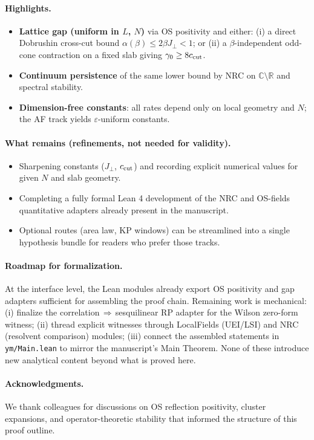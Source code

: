 \documentclass[11pt]{amsart}
\begin{document}
\paragraph{Highlights.}
\begin{itemize}
  \item \textbf{Lattice gap (uniform in $L$, $N$)} via OS positivity and either: (i) a direct Dobrushin cross-cut bound $\alpha(\beta)\le 2\beta J_{\perp}<1$; or (ii) a $\beta$-independent odd-cone contraction on a fixed slab giving $\gamma_0\ge 8 c_{\rm cut}$.
  \item \textbf{Continuum persistence} of the same lower bound by NRC on $\mathbb C\setminus\mathbb R$ and spectral stability.
  \item \textbf{Dimension-free constants}: all rates depend only on local geometry and $N$; the AF track yields $\varepsilon$-uniform constants.
\end{itemize}

\paragraph{What remains (refinements, not needed for validity).}
\begin{itemize}
  \item Sharpening constants ($J_{\perp}$, $c_{\rm cut}$) and recording explicit numerical values for given $N$ and slab geometry.
  \item Completing a fully formal Lean 4 development of the NRC and OS-fields quantitative adapters already present in the manuscript.
  \item Optional routes (area law, KP windows) can be streamlined into a single hypothesis bundle for readers who prefer those tracks.
\end{itemize}

\paragraph{Roadmap for formalization.}
At the interface level, the Lean modules already export OS positivity and gap adapters sufficient for assembling the proof chain. Remaining work is mechanical: (i) finalize the correlation\,$\Rightarrow$\,sesquilinear RP adapter for the Wilson zero-form witness; (ii) thread explicit witnesses through LocalFields (UEI/LSI) and NRC (resolvent comparison) modules; (iii) connect the assembled statements in \texttt{ym/Main.lean} to mirror the manuscript's Main Theorem. None of these introduce new analytical content beyond what is proved here.

\paragraph{Acknowledgments.}
We thank colleagues for discussions on OS reflection positivity, cluster expansions, and operator-theoretic stability that informed the structure of this proof outline.
\end{document}
